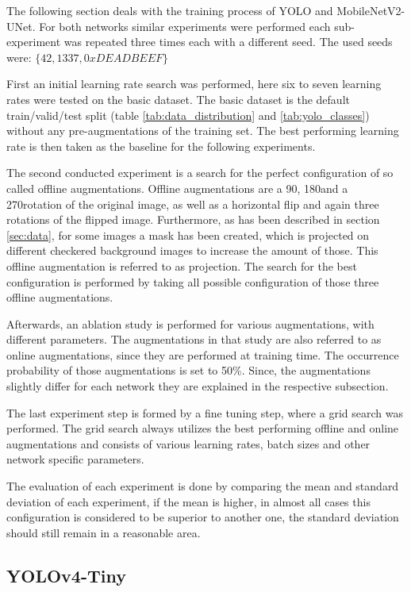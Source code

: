 The following section deals with the training process of YOLO and MobileNetV2-UNet.
For both networks similar experiments were performed each sub-experiment was repeated three times each with a different seed.
The used seeds were: $\{42, 1337, 0xDEADBEEF\}$

First an initial learning rate search was performed, here six to seven learning rates were tested on the basic dataset.
The basic dataset is the default train/valid/test split (table \ref{tab:data_distribution} and \ref{tab:yolo_classes}) without any pre-augmentations of the training set.
The best performing learning rate is then taken as the baseline for the following experiments.

The second conducted experiment is a search for the perfect configuration of so called offline augmentations.
Offline augmentations are a 90\textdegree, 180\textdegree and a 270\textdegree  rotation of the original image, as well as a horizontal flip and again three rotations of the flipped image.
Furthermore, as has been described in section \ref{sec:data}, for some images a mask has been created, which is projected on different checkered background images to increase the amount of those.
This offline augmentation is referred to as projection.
The search for the best configuration is performed by taking all possible configuration of those three offline augmentations.

Afterwards, an ablation study is performed for various augmentations, with different parameters.
The augmentations in that study are also referred to as online augmentations, since they are performed at training time.
The occurrence probability of those augmentations is set to 50\%.
Since, the augmentations slightly differ for each network they are explained in the respective subsection.

The last experiment step is formed by a fine tuning step, where a grid search was performed.
The grid search always utilizes the best performing offline and online augmentations and consists of various learning rates, batch sizes and other network specific parameters.

The evaluation of each experiment is done by comparing the mean and standard deviation of each experiment, if the mean is higher, in almost all cases this configuration is considered to be superior to another one, the standard deviation should still remain in a reasonable area.

\subsection{YOLOv4-Tiny}

